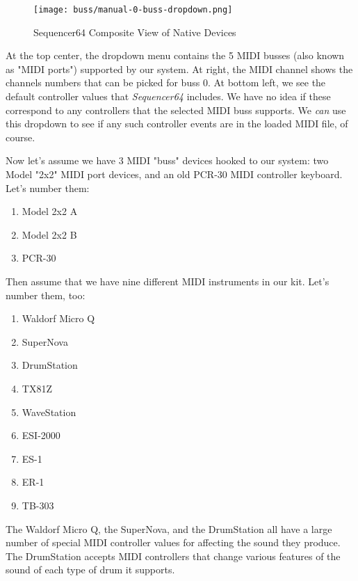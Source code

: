 \begin{figure}[H]
   \centering 
   \texttt{[image: buss/manual-0-buss-dropdown.png]}
   \caption{Sequencer64 Composite View of Native Devices}
   \label{fig:seq64_manual_0_buss_dropdown}
\end{figure}

   At the top center, the dropdown menu contains the 5 MIDI busses (also known
   as "MIDI ports") supported by our system.  At right, the MIDI channel shows
   the channels numbers that can be picked for buss 0.  At bottom left, we see
   the default controller values that \textsl{Sequencer64} includes.  We have
   no idea if these correspond to any controllers that the selected MIDI buss
   supports.  We \textsl{can} use this dropdown to see if any such controller
   events are in the loaded MIDI file, of course.

   Now let's assume we have 3 MIDI "buss" devices hooked to our system:
   two Model "2x2" MIDI port devices, and an old PCR-30 MIDI controller
   keyboard.  Let's number them:

   \begin{enumerate}
      \item Model 2x2 A
      \item Model 2x2 B
      \item PCR-30
   \end{enumerate}

   Then assume that we have nine different MIDI instruments in our kit.
   Let's number them, too:

   \begin{enumerate}
      \item Waldorf Micro Q
      \item SuperNova
      \item DrumStation
      \item TX81Z
      \item WaveStation
      \item ESI-2000
      \item ES-1
      \item ER-1
      \item TB-303
   \end{enumerate}

   The Waldorf Micro Q, the SuperNova, and the DrumStation all have a large
   number of special MIDI controller values for affecting the sound they
   produce.  The DrumStation accepts MIDI controllers that change various
   features of the sound of each type of drum it supports.

